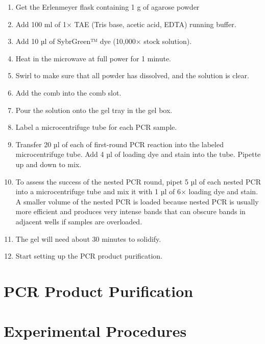 \documentclass[]{book}
\providecommand{\tightlist}{%
  \setlength{\itemsep}{0pt}\setlength{\parskip}{0pt}}
\begin{document}
\begin{enumerate}
\def\labelenumi{\arabic{enumi}.}
\setcounter{enumi}{1}
\tightlist
\item
  Get the Erlenmeyer flask containing 1 g of agarose powder
\item
  Add 100 ml of 1× TAE (Tris base, acetic acid, EDTA) running buffer.
\item
  Add 10 µl of SybrGreen™ dye (10,000× stock solution).
\item
  Heat in the microwave at full power for 1 minute.
\item
  Swirl to make sure that all powder has dissolved, and the solution is
  clear.
\item
  Add the comb into the comb slot.
\item
  Pour the solution onto the gel tray in the gel box.
\item
  Label a microcentrifuge tube for each PCR sample.
\item
  Transfer 20 µl of each of first-round PCR reaction into the labeled
  microcentrifuge tube. Add 4 µl of loading dye and stain into the tube.
  Pipette up and down to mix.
\item
  To assess the success of the nested PCR round, pipet 5 µl of each
  nested PCR into a microcentrifuge tube and mix it with 1 µl of 6×
  loading dye and stain. A smaller volume of the nested PCR is loaded
  because nested PCR is usually more efficient and produces very intense
  bands that can obscure bands in adjacent wells if samples are
  overloaded.
\item
  The gel will need about 30 minutes to solidify.
\item
  Start setting up the PCR product purification.
\end{enumerate}

\section{PCR Product Purification}\label{pcr-product-purification}

\section{Experimental Procedures}\label{experimental-procedures-13}
\end{document}
